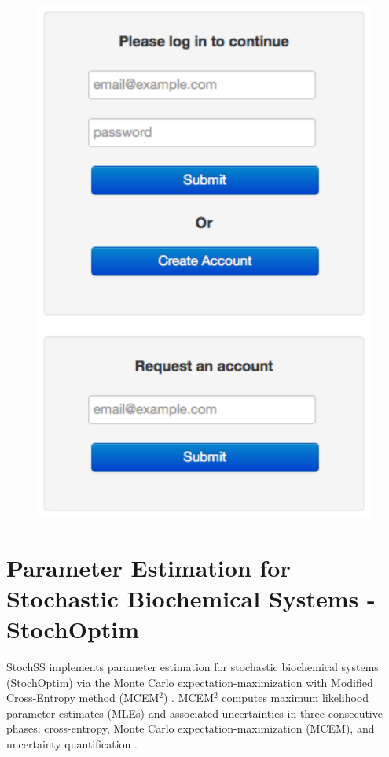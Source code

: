 \documentclass[12pt,notitlepage,nofootinbib]{revtex4}
\begin{document}
\begin{figure}[!htb]
\centering
\includegraphics[scale=0.6]{user-login.pdf}
\end{figure}

\section{Parameter Estimation for Stochastic Biochemical Systems - StochOptim}
StochSS implements parameter estimation for stochastic biochemical systems (StochOptim) via the Monte Carlo expectation-maximization with Modified Cross-Entropy method (MCEM$^2$) \cite{bernie}.
MCEM$^2$ computes maximum likelihood parameter estimates (MLEs) and associated uncertainties in three consecutive phases: cross-entropy, Monte Carlo expectation-maximization (MCEM), and uncertainty quantification \cite{bernie}.
\end{document}

